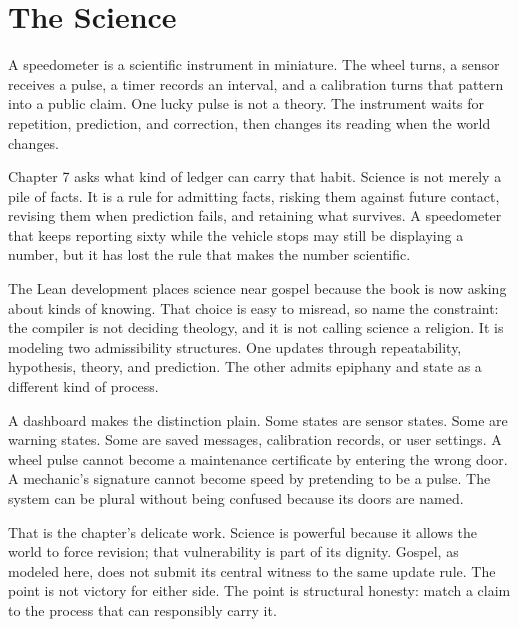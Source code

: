 \chapter{The Science}
\label{chap:the-science}


A speedometer is a scientific instrument in miniature. The wheel turns, a
sensor receives a pulse, a timer records an interval, and a calibration turns
that pattern into a public claim. One lucky pulse is not a theory. The
instrument waits for repetition, prediction, and correction, then changes its
reading when the world changes.

Chapter 7 asks what kind of ledger can carry that habit. Science is not merely
a pile of facts. It is a rule for admitting facts, risking them against future
contact, revising them when prediction fails, and retaining what survives. A
speedometer that keeps reporting sixty while the vehicle stops may still be
displaying a number, but it has lost the rule that makes the number scientific.

The Lean development places science near gospel because the book is now asking
about kinds of knowing. That choice is easy to misread, so name the constraint:
the compiler is not deciding theology, and it is not calling science a
religion. It is modeling two admissibility structures. One updates through
repeatability, hypothesis, theory, and prediction. The other admits epiphany
and state as a different kind of process.

A dashboard makes the distinction plain. Some states are sensor states. Some
are warning states. Some are saved messages, calibration records, or user
settings. A wheel pulse cannot become a maintenance certificate by entering the
wrong door. A mechanic's signature cannot become speed by pretending to be a
pulse. The system can be plural without being confused because its doors are
named.

That is the chapter's delicate work. Science is powerful because it allows the
world to force revision; that vulnerability is part of its dignity. Gospel, as
modeled here, does not submit its central witness to the same update rule. The
point is not victory for either side. The point is structural honesty: match a
claim to the process that can responsibly carry it.

